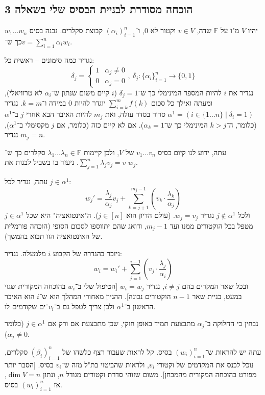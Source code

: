 \documentclass[]{article}
\newcommand\F         {\mathbb{F}}
\newcommand\co        {\colon}
\newcommand\ag        {\alpha}
\newcommand\bg        {\beta}
\newcommand\dg        {\delta}
\renewcommand\lg      {\lambda}
\newcommand\cl [1]    {\left ( #1 \right )}
\theoremstyle{definition}
\begin{document}
	\subsection*{הוכחה מסודרת לבניית הבסיס שלי בשאלה 3}
	יהיו $V$ מ"ו על $\F$ שדה, $v \in V$ וקטור לא $0$, ו־$(\ag_i)_{i = 1}^{n}$ קבוצת סקלרים. נבנה בסיס $w_1 \dots w_n$ כך ש־$v = \sum_{i = 1}^{n}\ag_iw_i$. 
	
	נגדיר כמה סימונים – ראשית כל: 
	\[ \dg_j = \begin{cases}
		1 & \ag_j \neq 0\\
		0 & \ag_j = 0
	\end{cases}, \ \dg_j \co \{\ag_i\}^{n}_{i = 1} \to \{0, 1\} \]
	נגדיר את $i$ להיות המספר המינימלי כך ש־$\dg_j = 1$ ($i$ קיים משום שנתון ש־$\ag_i$ לא טרוויאלי), ומעתה ואילך כל סכום $\sum_{i = k}^{m}f(k)$ יוגדר להיות $0$ במידה ו־$k = m$. נגדיר $\ag^{1} = (i \in \{1 \dots n\} \mid \dg_i = 1)$ סדור בסדר עולה, ואת $m_j$ להיות האיבר הבא אחרי $j$ ב־$\ag^1$ (כלומר, ה־$k > j$ המינימלי כך ש־$\ag_k = 1$). אם לא קיים כזה (כלומר, אם $j$ מקסימלי ב־$\ag^1$), נגדיר $m_j = n$. 
	
	עתה, ידוע לנו קיום בסיס $v_1 \dots v_n$ של $V$, ולכן קיימות $\lg_1 \dots \lg_n \in \F$ סקלרים כך ש־$\sum_{j = 1}^{n} \lg_jv_j = v$. ניעזר בו בשביל לבנות את $w_j$. 
	
	עתה, נגדיר לכל $j \in \ag^1$: 
	\[ w_j' = \frac{\lg_j}{\ag_j}v_j + \sum_{k = j + 1}^{m_j - 1}\cl{v_k \cdot \frac{\lg_k}{\ag_j}} \]
	ולכל $j \notin \ag^1$ נגדיר $w_j = v_j$. (עולם הדיון הוא $j \in [n]$). ה"אינטואציה" היא שכל $j \in \ag^1$ מטפל בכל הוקטורים ממנו ועד $m_j - 1$, ודואג שהם יתווספו לסכום הסופי (הוכחה פורמלית של האינטואציה הזו תבוא בהמשך). 
	
	ניזכר בהגדרה של הקבוע $i$ מלמעלה. נגדיר: 
	\[ w_i = w_i' + \sum_{j = 1}^{i - 1}\cl{v_j \cdot \frac{\lg_j}{\ag_i}} \]
	ובכל שאר המקרים בהם $i \neq j$, נגדיר $w_i = w_j$ [הטיפול שלי ב־$w_i$ בהוכחה המקורית שגוי במעט, בניית שאר $n - 1$ הוקטורים נכונה]. ההגיון מאחורי המהלך הוא ש־$i$ הוא האיבר הראשון ב־$\ag^1$ ולכן צריך לטפל גם ב־$v_i$־ים שקודמים לו. 
	
	נבחין כי החלוקה ב־$\ag_j$ מתבצעת תמיד באופן חוקי, שכן מתבצעת אם ורק אם $j \in \ag^1$ (כלומר $\ag_j \neq 0$). 
	
	עתה יש להראות ש־$(w_i)_{i = 1}^{n}$ בסיס. קל לראות שעבור רצף כלשהו של $(\bg_i)_{i = 1}^{n}$ סקלרים, נוכל לכנס את המקדמים של וקטורי $v_i$, ולראות שהביטוי בת"ל מזה ש־$v_i$ בסיס. [הסבר יותר מפורט בהוכחה המקורית מהמבחן]. משום שזוהי סדרת וקטורים מגודל $n$, ונתון $\dim V = n$, אז $(w_i)_{i = 1}^{n}$ בסיס. 
	
\end{document}
